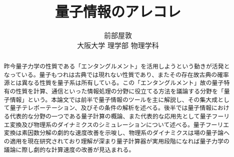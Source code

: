 \documentclass[a4paper,10.5pt]{article}
\title{量子情報のアレコレ}
\author{前部屋敦\\大阪大学 理学部 物理学科}
\numberwithin{equation}{section}
\begin{document}
\maketitle

\begin{abstract}
昨今量子力学の性質である「エンタングルメント」を活用しようという動きが活発となっている。量子もつれは古典では現れない性質であり、またその存在故古典の確率源とは異なる性質を量子系は所有している。この「エンタングルメント」故の量子特有の性質を計算、通信といった情報処理の分野に役立てる方法を議論する分野を「量子情報」という。本論文では前半で量子情報のツールを主に解説し、その集大成として量子テレポーテーション、及びその条件の解析を述べる。後半では量子情報における代表的な分野の一つである量子計算の概論、また代表的な応用先として量子フーリエ変換及び物理系のダイナミクスのシミュレーションについて述べる。量子フーリエ変換は素因数分解の劇的な速度改善を示唆し、物理系のダイナミクスは場の量子論への適用を現在研究されており理解が深まり量子計算器が実用段階になれば量子力学の議論に際し劇的な計算速度の改善が見込まれる。
\end{abstract}
\clearpage

\tableofcontents
\clearpage
\end{document}
